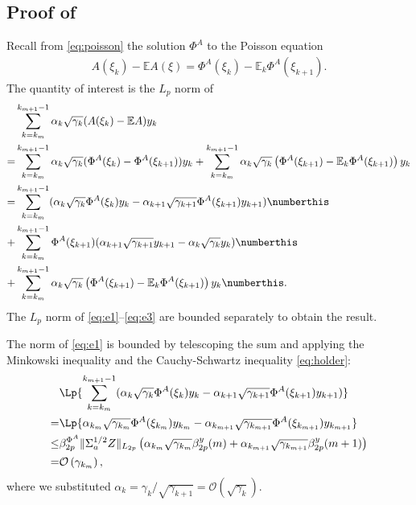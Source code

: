 \documentclass[11pt]{article}
\begin{document}
\subsection{Proof of }\label{app:e_state_dependent}
Recall from \eqref{eq:poisson} the solution $\Phi^{A}$ to the Poisson equation
\begin{align*}
    A(\xi_k) - \mathbb{E}A(\xi) = 
    \Phi^A (\xi_k) - \mathbb{E}_k \Phi^A (\xi_{k+1})
    .
\end{align*}
The quantity of interest is the $L_p$ norm of
\begin{align*}
    &\sum_{k=k_m}^{k_{m+1} - 1} \alpha_k \sqrt{\gamma_k} (A(\xi_k) - \mathbb{E}A) y_k 
    \\=& 
    \sum_{k=k_m}^{k_{m+1} - 1} \alpha_k \sqrt{\gamma_k} (\Phi^A (\xi_k) - \Phi^A(\xi_{k+1})) y_k 
    + \sum_{k=k_m}^{k_{m+1} - 1} \alpha_k \sqrt{\gamma_k} \left(\Phi^A (\xi_{k+1}) - \mathbb{E}_{k} \Phi^A (\xi_{k+1}) \right) y_k 
    \\ 
    = 
    &
    \sum_{k=k_m}^{k_{m+1} - 1} (\alpha_k \sqrt{\gamma_k} \Phi^A(\xi_k) y_k - \alpha_{k+1} \sqrt{\gamma_{k+1}} \Phi^A(\xi_{k+1}) y_{k+1}) \numberthis \label{eq:e1}
    \\ + &
    \sum_{k=k_m}^{k_{m+1} - 1} \Phi^A (\xi_{k+1}) (\alpha_{k+1} \sqrt{\gamma_{k+1}} y_{k+1} - \alpha_k \sqrt{\gamma_k} y_k ) \numberthis \label{eq:e2}
    \\ +
    &\sum_{k=k_m}^{k_{m+1} - 1} \alpha_k \sqrt{\gamma_k} \left(\Phi^A (\xi_{k+1}) - \mathbb{E}_{k} \Phi^A (\xi_{k+1}) \right) y_k 
    \numberthis \label{eq:e3}
    .
\end{align*}
The $L_p$ norm of \eqref{eq:e1}--\eqref{eq:e3} are bounded separately to obtain the result. 



The norm of \eqref{eq:e1} is bounded by telescoping the sum and applying the Minkowski inequality and the Cauchy-Schwartz inequality \eqref{eq:holder}:
\begin{align*}
    &\Lp{    \sum_{k=k_m}^{k_{m+1} - 1} (\alpha_k \sqrt{\gamma_k} \Phi^A(\xi_k) y_k - \alpha_{k+1} \sqrt{\gamma_{k+1}} \Phi^A(\xi_{k+1}) y_{k+1})}
    \\ 
    =&
    \Lp{\alpha_{k_m} \sqrt{\gamma_{k_m}} \Phi^A (\xi_{k_m}) y_{k_m} - \alpha_{k_{m+1}} \sqrt{\gamma_{k_{m+1}}} \Phi^A (\xi_{k_{m+1}}) y_{k_{m+1}}}
    \\ \leq & 
    \beta_{2p}^{\Phi^A} \lVert \Sigma_a^{1/2} Z \rVert_{L_{2p}}
    \left( \alpha_{k_m} \sqrt{\gamma_{k_m}} \beta_{2p}^y (m)  + \alpha_{k_{m+1}} \sqrt{\gamma_{k_{m+1}}} \beta_{2p}^y (m+1)\right) 
    \\ 
    = &\mathcal{O}\left(\gamma_{k_m}  \right) , 
\end{align*}
where we substituted $\alpha_k = \gamma_k/\sqrt{\gamma_{k+1}} = \mathcal{O}(\sqrt{\gamma_k})$. 
\end{document}
